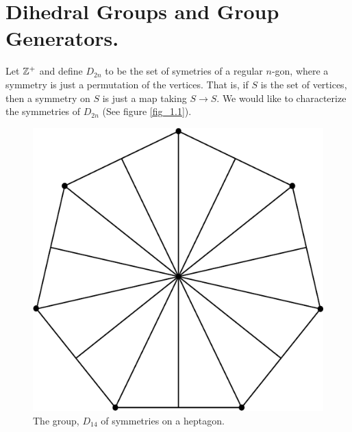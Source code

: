 \section{Dihedral Groups and Group Generators.}
\label{section_1.2}

Let $\mathbb{Z}^+$ and define $D_{2n}$ to be the set of symetries of a regular $n$-gon,
where a symmetry is just a permutation of the vertices. That is, if  $S$ is the
set of vertices, then a symmetry on  $S$ is just a map taking $S \rightarrow S$.
We would like to characterize the symmetries of $D_{2n}$ (See figure
\ref{fig_1.1}).

\begin{figure}
  \centering
  \includegraphics[scale=0.2]{parts/group_theory/figures/Chapter1/D_14_symm.eps}
  \caption{The group, $D_{14}$ of symmetries on a heptagon.}
  \label{figure_1.1}
\end{figure}

